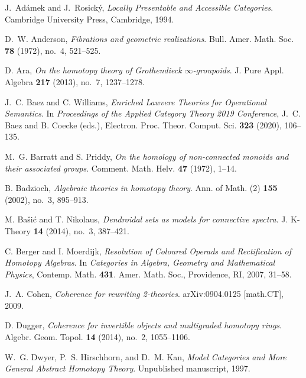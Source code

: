 \documentclass{tac}
\begin{document}
\begin{references*}
J.~Ad\'{a}mek and J.~Rosick\'{y},
\emph{Locally Presentable and Accessible Categories}.
Cambridge University Press, Cambridge, 1994.

D.~W. Anderson,
\emph{Fibrations and geometric realizations}.
Bull. Amer. Math. Soc. \textbf{78} (1972), no.~4, 521--525.

D. Ara,
\emph{On the homotopy theory of Grothendieck $\infty$-groupoids}.
J. Pure Appl. Algebra \textbf{217} (2013), no.~7, 1237--1278.

J.~C. Baez and C. Williams,
\emph{Enriched Lawvere Theories for Operational Semantics}.
In \emph{Proceedings of the Applied Category Theory 2019 Conference},
J.~C. Baez and B. Coecke (eds.),
Electron. Proc. Theor. Comput. Sci. \textbf{323} (2020), 106--135.

M.~G. Barratt and S. Priddy,
\emph{On the homology of non-connected monoids and their associated groups}.
Comment. Math. Helv. \textbf{47} (1972), 1--14.

B. Badzioch,
\emph{Algebraic theories in homotopy theory}.
Ann. of Math. (2) \textbf{155} (2002), no.~3, 895--913.

M. Ba\v{s}i\'c and T. Nikolaus,
\emph{Dendroidal sets as models for connective spectra}.
J. K-Theory \textbf{14} (2014), no.~3, 387--421.

C. Berger and I. Moerdijk,
\emph{Resolution of Coloured Operads and Rectification of Homotopy Algebras}.
In \emph{Categories in Algebra, Geometry and Mathematical Physics},
Contemp. Math. \textbf{431}.
Amer. Math. Soc., Providence, RI, 2007, 31--58.

J.~A. Cohen,
\emph{Coherence for rewriting 2-theories}.
arXiv:0904.0125 [math.CT], 2009.

D. Dugger,
\emph{Coherence for invertible objects and multigraded homotopy rings}.
Algebr. Geom. Topol. \textbf{14} (2014), no.~2, 1055--1106.

W.~G. Dwyer, P.~S. Hirschhorn, and D.~M. Kan,
\emph{Model Categories and More General Abstract Homotopy Theory}.
Unpublished manuscript, 1997.


\end{references*}
\end{document}
